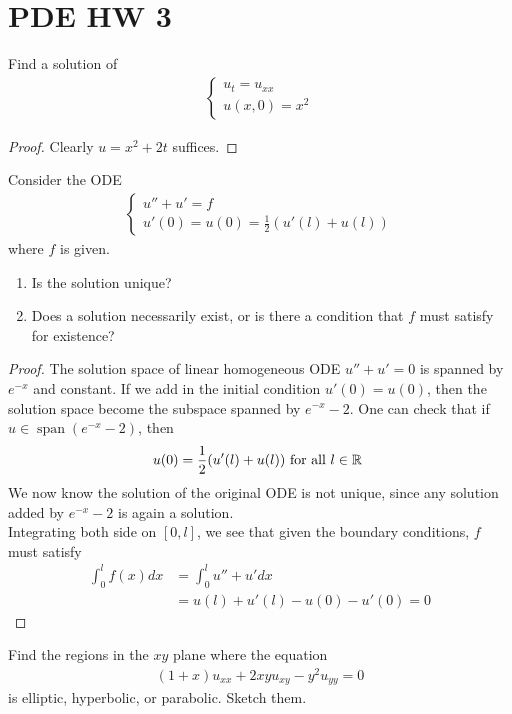 \documentclass{report}
\begin{document}
\section{PDE HW 3}
\begin{question}{}{}
Find a solution of 
\begin{align*}
\begin{cases}
  u_t=u_{xx}\\
  u(x,0)=x^2
\end{cases}
\end{align*}
\end{question}
\begin{proof}
Clearly $u=x^2+2t$ suffices.
\end{proof}
\begin{question}{}{}
Consider the ODE 
\begin{align*}
\begin{cases}
  u''+u'=f \\
  u'(0)=u(0)=\frac{1}{2}(u'(l)+u(l))
\end{cases}
\end{align*}
where $f$ is given. 
\begin{enumerate}[label=(\alph*)]
  \item Is the solution unique? 
  \item Does a solution necessarily exist, or is there a condition that $f$ must satisfy for existence? 
\end{enumerate}
\end{question}
\begin{proof}
The solution space of linear homogeneous ODE $u''+u'=0$  is spanned by $e^{-x}$ and constant. If we add in the initial condition  $u'(0)=u(0)$, then the solution space become the subspace spanned by $e^{-x}-2$. One can check that if $u \in\operatorname{span}(e^{-x}-2)$, then 
\begin{align*}
u(0)=\frac{1}{2}(u'(l)+u(l))\text{ for all $l\in\mathbb{R}$ }
\end{align*}
We now know the solution of the original ODE is not unique, since any solution added by $e^{-x}-2$ is again a solution. \\

Integrating both side on $[0,l]$, we see that given the boundary conditions, $f$ must satisfy 
\begin{align*}
\int_0^l f(x)dx&=\int_0^l u''+u'dx\\
&=u(l)+u'(l)-u(0)-u'(0)=0
\end{align*}
\end{proof}
\begin{question}{}{}
Find the regions in the $xy$ plane where the equation 
 \begin{align*}
   (1+x)u_{xx}+2xyu_{xy}-y^2u_{yy}=0
\end{align*}
is elliptic, hyperbolic, or parabolic. Sketch them. 
\end{question}
\end{document}

